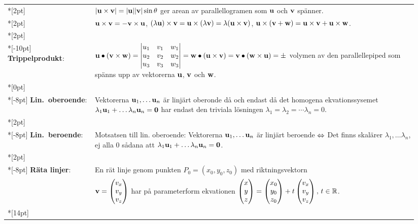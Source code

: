 \documentclass{article}
\begin{document}
\begin{tabular}{|p{0.2\linewidth}|p{0.745\linewidth}|}
  \\*[2pt]
  &$|{\mathbf u}\times{\mathbf v}|=|{\mathbf u}||{\mathbf v}|\sin\theta$ 
  ger
  arean av parallellogramen som ${\mathbf u}$ och ${\mathbf v}$ spänner.
  \\*[2pt]
  &${\mathbf u}\times{\mathbf v}=-{\mathbf v}\times {\mathbf u}$, 
  $(\lambda {\mathbf u})\times{\mathbf v}={\mathbf u}\times(\lambda {\mathbf v})=\lambda ({\mathbf u}\times{\mathbf v})$, 
  ${\mathbf u}\times({\mathbf v}+{\mathbf w})={\mathbf u}\times{\mathbf v}+{\mathbf u}\times{\mathbf w}$.
  \\*[2pt] \hline & \\*[-10pt]
  \textbf{Trippelprodukt}:
  &
  $
  {\mathbf u}\bullet({\mathbf v}\times{\mathbf w})=
  \begin{vmatrix}
    u_1&v_1&w_1\\
    u_2&v_2&w_2\\
    u_3&v_3&w_3
  \end{vmatrix}
  = {\mathbf w}\bullet({\mathbf u}\times{\mathbf v})
  = {\mathbf v}\bullet({\mathbf w}\times{\mathbf u})
  = \pm $ volymen av den parallellepiped som spänns upp av vektorerna
  ${\mathbf u}$, ${\mathbf v}$ och ${\mathbf w}$.\\*[0pt]
  \hline
  &
  \\*[-8pt]
  \textbf{Lin.~oberoende}: 
  & 
  Vektorerna ${\mathbf u}_1,\dots{\mathbf u}_n$ är linjärt 
  oberonde då och endast då det homogena ekvationssysemet
  $\lambda_1{\mathbf u}_1+\dots\lambda_n{\mathbf u}_n={\mathbf 0}$
  har endast den triviala lösningen
  $\lambda_1=\lambda_2=\cdots\lambda_n=0$.
  \\*[2pt]
  \hline
  &\\*[-8pt]
  \textbf{Lin.~beroende}: 
  &
  Motsatsen till lin. oberoende: 
  Vektorerna ${\mathbf u}_1,\dots{\mathbf u}_n$ är
  linjärt beroende $\Leftrightarrow$ Det finns skalärer $\lambda_1,\dots\lambda_n$,
  ej alla 0 sådana att $\lambda_1{\mathbf u}_1+\dots\lambda_n{\mathbf u}_n=\mathbf 0$.
  \\*[2pt] \hline &\\*[-8pt]
  \textbf{Räta linjer}: 
  &
  En rät linje genom punkten $P_0=(x_0,y_0,z_0)$ med
  riktningsvektorn\\
  &$\bdv=\trevektor[v_x,v_y,v_z]$ har på parameterform ekvationen 
  $\trevektor[x,y,z]=\trevektor[x_0,y_0,z_0]+t\trevektor[v_x,v_y,v_z],\,
  t\in\mathbb R$.
  \\*[14pt] \hline
\end{tabular}%
\end{document}
